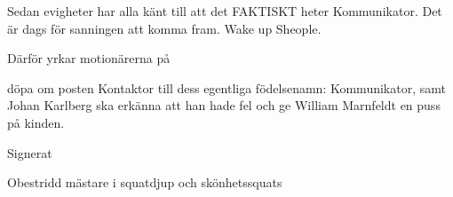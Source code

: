 \documentclass[../_main/handlingar.tex]{subfiles}
\begin{document}
Sedan evigheter har alla känt till att det FAKTISKT heter Kommunikator. Det är dags för sanningen att
komma fram. Wake up Sheople.

Därför yrkar motionärerna på
\begin{attsatser}
  \att döpa om posten Kontaktor till dess egentliga födelsenamn: Kommunikator, samt
  \att Johan Karlberg ska erkänna att han hade fel och ge William Marnfeldt en puss på kinden.
\end{attsatser}

\begin{signatures}{1}
    Signerat
    \signature{William Marnfeldt}{Obestridd mästare i squatdjup och skönhetssquats}

\end{signatures}
\end{document}
